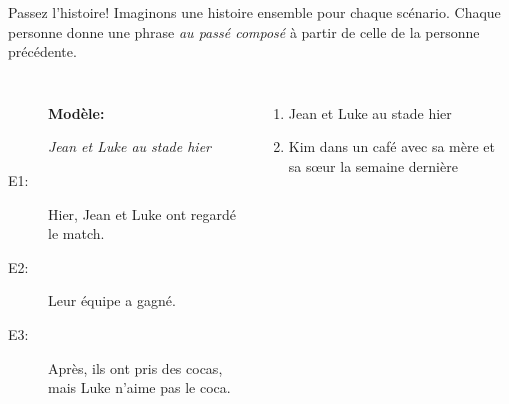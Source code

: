 \documentclass{beamer}
\begin{document}
  \begin{frame}{Passez l'histoire!}
    Imaginons une histoire ensemble pour chaque scénario.
    Chaque personne donne une phrase \emph{au passé composé} à partir de celle de la personne précédente. \\
    \begin{columns}
        \begin{description}
          \item[] \textbf{Modèle:}
          \item[] \emph{Jean et Luke au stade hier}
          \item[E1:] Hier, Jean et Luke ont regardé le match.
          \item[E2:] Leur équipe a gagné.
          \item[E3:] Après, ils ont pris des cocas, mais Luke n'aime pas le coca.
        \end{description}
        \begin{enumerate}
          \item Jean et Luke au stade hier
          \item Kim dans un café avec sa mère et sa sœur la semaine dernière
        \end{enumerate}
    \end{columns}
  \end{frame}
\end{document}
